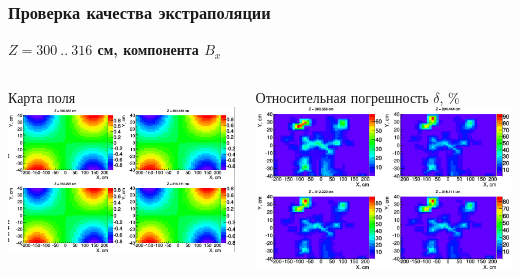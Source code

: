 \documentclass[svgnames] {beamer}
\begin{document}
\begin{frame}
  \frametitle{Проверка качества экстраполяции}
  \begin{block}{\centering \bf $Z = 300 ~..~ 316$ см, компонента $B_{x}$}
    \begin{columns}[c]
      \begin{block}{\centering Карта поля}
        \centering \includegraphics[width=1.0\linewidth]{Bx_fieldMap_new.png}
      \end{block}
      \begin{block}{\footnotesize Относительная погрешность \centering $\delta$, \%}
        \centering \includegraphics[width=1.0\linewidth]{Bx_diff_overlap_reg_new.png}
      \end{block}
    \end{columns}
   \end{block} 
 \end{frame}
\end{document}
